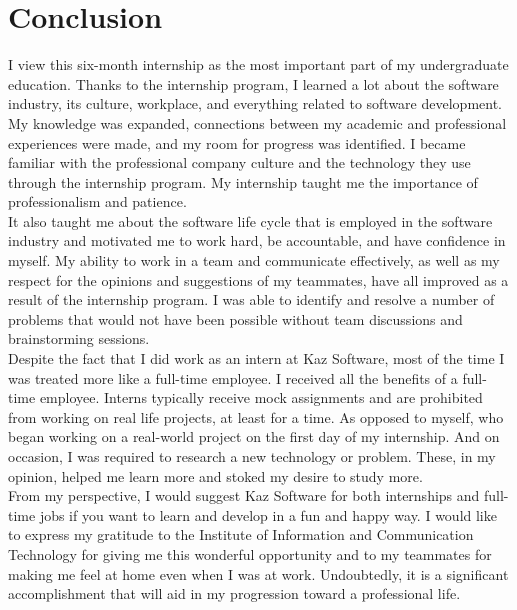 \chapter{Conclusion}

I view this six-month internship as the most important part of my undergraduate education.
Thanks to the internship program, I learned a lot about the software industry, its culture, workplace, and everything related to software development.
My knowledge was expanded, connections between my academic and professional experiences were made, and my room for progress was identified.
I became familiar with the professional company culture and the technology they use through the internship program.
My internship taught me the importance of professionalism and patience.\\

It also taught me about the software life cycle that is employed in the software industry and motivated me to work hard, be accountable, and have confidence in myself.
My ability to work in a team and communicate effectively, as well as my respect for the opinions and suggestions of my teammates, have all improved as a result of the internship program.
I was able to identify and resolve a number of problems that would not have been possible without team discussions and brainstorming sessions.\\

Despite the fact that I did work as an intern at Kaz Software, most of the time I was treated more like a full-time employee.
I received all the benefits of a full-time employee.
Interns typically receive mock assignments and are prohibited from working on real life projects, at least for a time.
As opposed to myself, who began working on a real-world project on the first day of my internship.
And on occasion, I was required to research a new technology or problem.
These, in my opinion, helped me learn more and stoked my desire to study more.\\

From my perspective, I would suggest Kaz Software for both internships and full-time jobs if you want to learn and develop in a fun and happy way.
I would like to express my gratitude to the Institute of Information and Communication Technology for giving me this wonderful opportunity and to my teammates for making me feel at home even when I was at work.
Undoubtedly, it is a significant accomplishment that will aid in my progression toward a professional life.